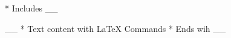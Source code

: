 * Includes __\documentclass{class_name}__
\begin{document}
__
    * Text content with LaTeX Commands
    * Ends wih __
\end{document}
